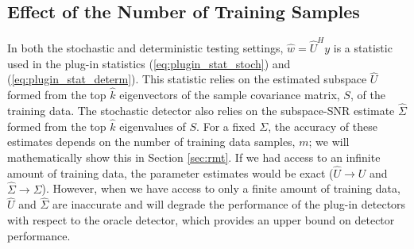 \subsection{Effect of the Number of Training Samples}\label{sec:training_effect}
In both the stochastic and deterministic testing settings, $\widehat{w}=\widehat{U}^Hy$ is a statistic used in the plug-in statistics (\ref{eq:plugin_stat_stoch}) and (\ref{eq:plugin_stat_determ}). This statistic relies on the estimated subspace $\widehat{U}$ formed from the top $\widehat{k}$ eigenvectors of the sample covariance matrix, $S$, of the training data. The stochastic detector also relies on the subspace-SNR estimate $\widehat{\Sigma}$ formed from the top $\widehat{k}$ eigenvalues of $S$. For a fixed $\Sigma$, the accuracy of these estimates depends on the number of training data samples, $m$; we will mathematically show this in Section \ref{sec:rmt}. If we had access to an infinite amount of training data, the parameter estimates would be exact ($\widehat{U}\to U$ and $\widehat{\Sigma}\to\Sigma$). However, when we have access to only a finite amount of training data, $\widehat{U}$ and $\widehat{\Sigma}$ are inaccurate and will degrade the performance of the plug-in detectors with respect to the oracle detector, which provides an upper bound on detector performance.

